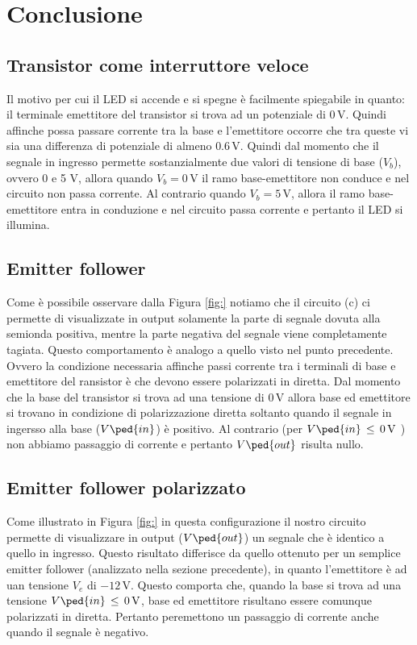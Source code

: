 \section*{Conclusione}

\subsection*{Transistor come interruttore veloce}

Il motivo per cui il LED si accende e si spegne è facilmente spiegabile in quanto: il terminale emettitore del transistor si trova ad un potenziale di $0\,\si{\volt}$. Quindi affinche possa passare corrente tra la base e l'emettitore occorre che tra queste vi sia una differenza di potenziale di almeno $0.6\,\si{\volt}$. Quindi dal momento che il segnale in ingresso permette sostanzialmente due valori di tensione di base ($V_b$), ovvero 0 e 5 $\si{\volt}$, allora quando $V_b=0\,\si{\volt}$ il ramo base-emettitore non conduce e nel circuito non passa corrente. Al contrario quando $V_b=5\,\si{\volt}$, allora il ramo base-emettitore entra in conduzione e nel circuito passa corrente e pertanto il LED si illumina.

\subsection*{Emitter follower}

Come è possibile osservare dalla Figura \ref{fig:} notiamo che il circuito (c) ci permette di visualizzate in output solamente la parte di segnale dovuta alla semionda positiva, mentre la parte negativa del segnale viene completamente tagiata. Questo comportamento è analogo a quello visto nel punto precedente. Ovvero la condizione necessaria affinche passi corrente tra i terminali di base e emettitore del ransistor è che devono essere polarizzati in diretta. Dal momento che la base del transistor si trova ad una tensione di $0\,\si{\volt}$ allora base ed emettitore si trovano in condizione di polarizzazione diretta soltanto quando il segnale in ingersso alla base ($V\ped{in}$) è positivo. Al contrario (per $V\ped{in}\,\leq\,0\,\si{\volt}$ ) non abbiamo passaggio di corrente e pertanto $V\ped{out}$ risulta nullo.

\subsection*{Emitter follower polarizzato}

Come illustrato in Figura \ref{fig:} in questa configurazione il nostro circuito permette di visualizzare in output ($V\ped{out}$) un segnale che è identico a quello in ingresso. Questo risultato differisce da quello ottenuto per un semplice emitter follower (analizzato nella sezione precedente), in quanto l'emettitore è ad uan tensione $V_e$ di $-12\,\si{\volt}$. Questo comporta che, quando la base si trova ad una tensione $V\ped{in}\,\leq\,0\,\si{\volt}$, base ed emettitore risultano essere comunque polarizzati in diretta. Pertanto peremettono un passaggio di corrente anche quando il segnale è negativo.

